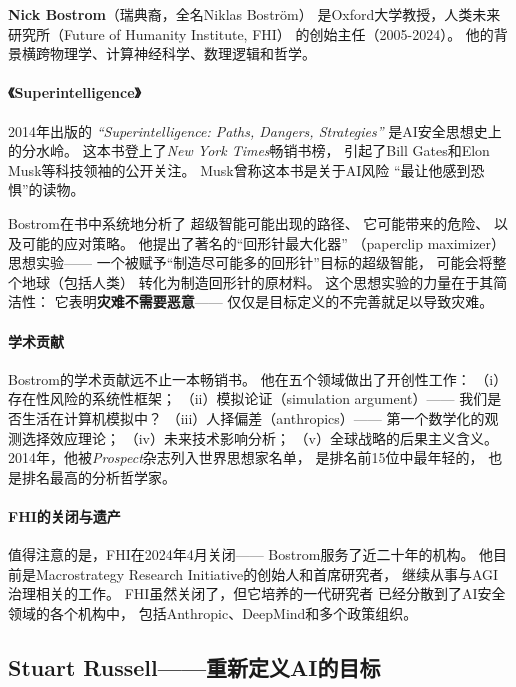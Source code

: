 \textbf{Nick Bostrom}（瑞典裔，全名Niklas Boström）
是Oxford大学教授，人类未来研究所（Future of Humanity Institute, FHI）
的创始主任（2005-2024）。
他的背景横跨物理学、计算神经科学、数理逻辑和哲学。

\paragraph{《Superintelligence》}
2014年出版的
\textit{``Superintelligence: Paths, Dangers, Strategies''}
是AI安全思想史上的分水岭。
这本书登上了\textit{New York Times}畅销书榜，
引起了Bill Gates和Elon Musk等科技领袖的公开关注。
Musk曾称这本书是关于AI风险
``最让他感到恐惧''的读物。

Bostrom在书中系统地分析了
超级智能可能出现的路径、
它可能带来的危险、
以及可能的应对策略。
他提出了著名的``回形针最大化器''
（paperclip maximizer）思想实验——
一个被赋予``制造尽可能多的回形针''目标的超级智能，
可能会将整个地球（包括人类）
转化为制造回形针的原材料。
这个思想实验的力量在于其简洁性：
它表明\textbf{灾难不需要恶意}——
仅仅是目标定义的不完善就足以导致灾难。

\paragraph{学术贡献}
Bostrom的学术贡献远不止一本畅销书。
他在五个领域做出了开创性工作：
（i）存在性风险的系统性框架；
（ii）模拟论证（simulation argument）——
我们是否生活在计算机模拟中？
（iii）人择偏差（anthropics）——
第一个数学化的观测选择效应理论；
（iv）未来技术影响分析；
（v）全球战略的后果主义含义。
2014年，他被\textit{Prospect}杂志列入世界思想家名单，
是排名前15位中最年轻的，
也是排名最高的分析哲学家。

\paragraph{FHI的关闭与遗产}
值得注意的是，FHI在2024年4月关闭——
Bostrom服务了近二十年的机构。
他目前是Macrostrategy Research Initiative的创始人和首席研究者，
继续从事与AGI治理相关的工作。
FHI虽然关闭了，但它培养的一代研究者
已经分散到了AI安全领域的各个机构中，
包括Anthropic、DeepMind和多个政策组织。

\subsection{Stuart Russell——重新定义AI的目标}
\label{subsec:russell}


